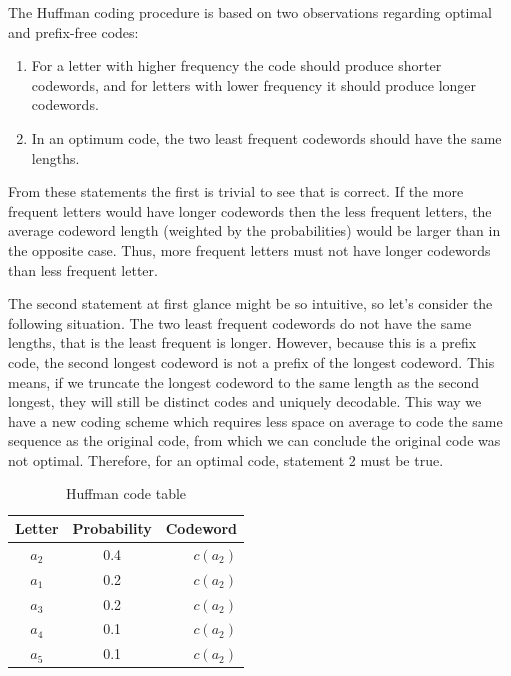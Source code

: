 The Huffman coding procedure is based on two observations regarding optimal and prefix-free codes:
\begin{enumerate}
\item For a letter with higher frequency the code should produce shorter codewords, and for letters with lower frequency it should produce longer codewords.
\item In an optimum code, the two least frequent codewords should have the same lengths.
\end{enumerate}

From these statements the first is trivial to see that is correct. If the more frequent letters would have longer codewords then the less frequent letters, the average codeword length (weighted by the probabilities) would be larger than in the opposite case. Thus, more frequent letters must not have longer codewords than less frequent letter.

The second statement at first glance might be so intuitive, so let's consider the following situation. The two least frequent codewords do not have the same lengths, that is the least frequent is longer. However, because this is a prefix code, the second longest codeword is not a prefix of the longest codeword. This means, if we truncate the longest codeword to the same length as the second longest, they will still be distinct codes and uniquely decodable. This way we have a new coding scheme which requires less space on average to code the same sequence as the original code, from which we can conclude the original code was not optimal. Therefore, for an optimal code, statement 2 must be true.

\begin{table}
\caption{Huffman code table}
\centering
\begin{tabular}{ccr}
\toprule
Letter & Probability & Codeword \\
\midrule
$a_2$ & 0.4 & $c(a_2)$ \\
$a_1$ & 0.2 & $c(a_2)$ \\
$a_3$ & 0.2 & $c(a_2)$ \\
$a_4$ & 0.1 & $c(a_2)$ \\
$a_5$ & 0.1 & $c(a_2)$ \\
\bottomrule
\end{tabular}
\label{tab:huffman1}
\end{table}

